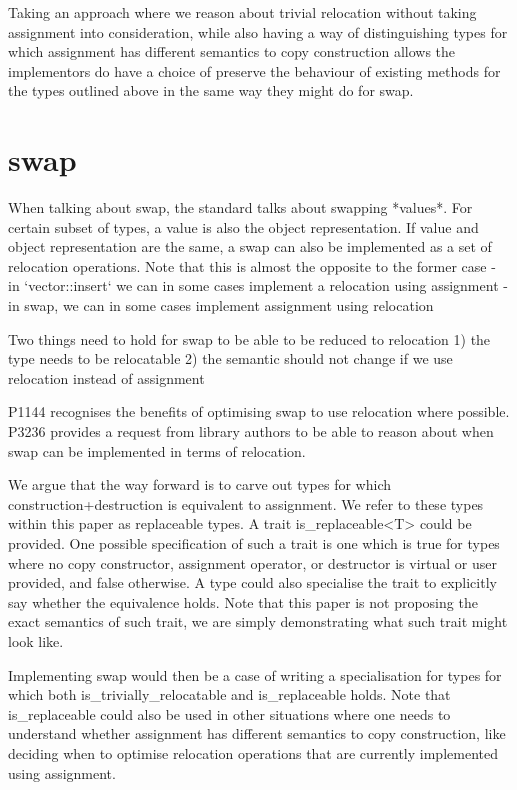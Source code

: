 \documentclass{wg21}
\begin{document}
Taking an approach where we reason about trivial relocation without taking assignment into consideration, while also having a way of distinguishing types for which assignment has different semantics to copy construction allows the implementors do have a choice of preserve the behaviour of existing methods for the types outlined above in the same way they might do for swap.

\section{swap}

When talking about swap, the standard talks about swapping *values*. For certain subset of types, a value is also the object representation. If value and object representation are the same, a swap can also be implemented as a set of relocation operations. Note that this is almost the opposite to the former case
- in `vector::insert` we can in some cases implement a relocation using assignment
- in swap, we can in some cases implement assignment using relocation


Two things need to hold for swap to be able to be reduced to relocation
1) the type needs to be relocatable
2) the semantic should not change if we use relocation instead of assignment

P1144 recognises the benefits of optimising swap to use relocation where possible. P3236 provides a request from library authors to be able to reason about when swap can be implemented in terms of relocation.

We argue that the way forward is to carve out types for which construction+destruction is equivalent to assignment. We refer to these types within this paper as replaceable types. A trait is_replaceable<T> could be provided. One possible specification of such a trait is one which is true for types where no copy constructor, assignment operator, or destructor is virtual or user provided, and false otherwise. A type could also specialise the trait to explicitly say whether the equivalence holds. Note that this paper is not proposing the exact semantics of such trait, we are simply demonstrating what such trait might look like.

Implementing swap would then be a case of writing a specialisation for types for which both is_trivially_relocatable and is_replaceable holds. Note that is_replaceable could also be used in other situations where one needs to understand whether assignment has different semantics to copy construction, like deciding when to optimise relocation operations that are currently implemented using assignment.
\end{document}
